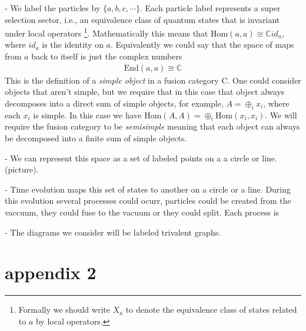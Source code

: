 \documentclass[11pt]{article}
\numberwithin{equation}{section}
\begin{document}
- We label the particles by $\{ a, b, c, \cdots \}$. 
Each particle label represents a super selection sector, i.e., an equivalence class of quantum states that is invariant under local operators \footnote{Formally we should write $X_a$ to denote the equivalence class of states related to $a$ by local operators.}. 
Mathematically this means that $\text{Hom}(a,a) \cong \mathbb{C} id_a$, where $id_a$ is the identity on $a$.
Equivalently we could say that the space of maps from $a$ back to itself is just the complex numbers
\begin{align}
\text{End}(a,a) \cong \mathbb{C}
\end{align}
This is the definition of a {\em simple object} in a fusion category {\cal C}. 
One could consider objects that aren't simple, but we require that in this case that object always decomposes into a direct sum of simple objects, for example, $A = \oplus_i x_i$, where each $x_i$ is simple. 
In this case we have $\text{Hom}(A,A)= \oplus_i \text{Hom}(x_i,x_i)$. 
We will require the fusion category to be {\em semisimple} meaning that each object can always be decomposed into a finite sum of simple objects.

- We can represent this space as a set of labeled points on a a circle or line. (picture).

- Time evolution maps this set of states to another on a circle or a line. During this evolution several processes could ocurr, particles could be created from the vaccuum, they could fuse to the vacuum or they could split. 
Each process is 

- The diagrams we consider will be labeled trivalent graphs. 



\section{appendix 2}


\end{document}
